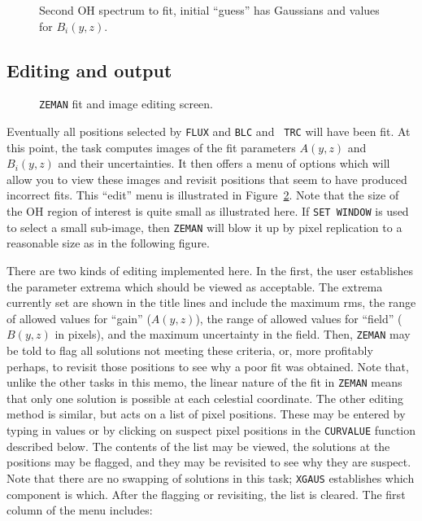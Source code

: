 \documentclass[twoside]{article}
\newcommand{\Me}[1]{\textcolor{mecol}{#1}}
\newcommand{\putfig}[1]{\texttt{[image: \#1.eps]}}
\begin{document}
\begin{figure}
\begin{center}
\resizebox{5.5in}{!}{\putfig{ZEMAN.init2}}
\caption{Second OH spectrum to fit, initial ``guess'' has Gaussians and
   values for $B_i(y,z)$.}
\label{fig:ZEMAN.init2}
\end{center}
\end{figure}

\vfill\eject
\subsection{Editing and output}

\begin{figure}
\begin{center}
\resizebox{6.0in}{!}{\putfig{ZEMAN.edit}}
\caption{{\tt ZEMAN} fit and image editing screen.}
\label{fig:ZEMAN.edit}
\end{center}
\end{figure}

Eventually all positions selected by {\tt FLUX} and {\tt BLC} and {\tt
  TRC} will have been fit.  At this point, the task computes images of
the fit parameters $A(y,z)$ and $B_i(y,z)$ and their uncertainties.
It then offers a menu of options which will allow you to view these
images and revisit positions that seem to have produced incorrect
fits.  This ``edit'' menu is illustrated in
Figure~\ref{fig:ZEMAN.edit}.  Note that the size of the OH \Me{region
of interest} is quite small \Me{as illustrated here.  If {\tt SET
  WINDOW} is used to select a small sub-image, then} {\tt ZEMAN} will
blow it up by pixel replication to a reasonable size \Me{as in the
  following figure}.

There are two kinds of editing implemented here.  In the first, the
user establishes the parameter extrema which should be viewed as
acceptable.  The extrema currently set are shown in the title lines
and include the maximum rms, the range of allowed values for ``gain''
($A(y,z)$), the range of allowed values for ``field'' ($B(y,z)$ in
pixels), and the maximum uncertainty in the field.  Then, {\tt ZEMAN}
may be told to flag all solutions not meeting these criteria, or, more
profitably perhaps, to revisit those positions to see why a poor fit
was obtained.  Note that, unlike the other tasks in this memo, the
linear nature of the fit in {\tt ZEMAN} means that only one solution
is possible at each celestial coordinate.  The other editing method is
similar, but acts on a list of pixel positions.  These may be entered
by typing in values or by clicking on suspect pixel positions in the
{\tt CURVALUE} function described below.  The contents of the list may
be viewed, the solutions at the positions may be flagged, and they may
be revisited to see why they are suspect.  Note that there are no
swapping of solutions in this task; {\tt XGAUS} establishes which
component is which.  After the flagging or revisiting, the list is
cleared.  The first column of the menu includes:
\vfill\eject
\end{document}
